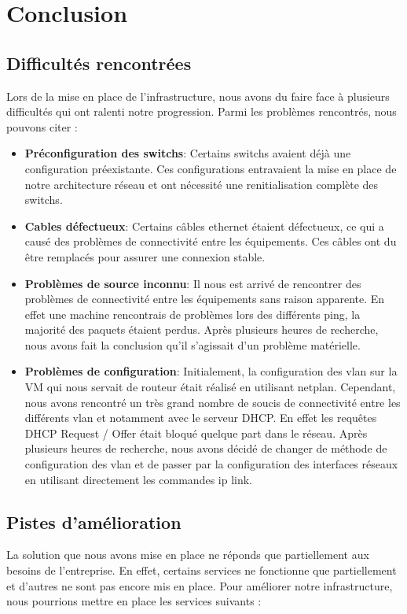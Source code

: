 \documentclass[a4paper,12pt]{report}
\begin{document}
    \chapter{Conclusion}
        \section{Difficultés rencontrées}

            Lors de la mise en place de l'infrastructure, nous avons du faire face à plusieurs difficultés qui ont ralenti notre progression. Parmi les problèmes rencontrés, nous pouvons citer :

            \begin{itemize}
                \item \textbf{Préconfiguration des switchs}: Certains switchs avaient déjà une configuration préexistante. Ces configurations entravaient la mise en place de notre architecture réseau et ont nécessité une renitialisation complète des switchs.
                \item \textbf{Cables défectueux}: Certains câbles ethernet étaient défectueux, ce qui a causé des problèmes de connectivité entre les équipements. Ces câbles ont du être remplacés pour assurer une connexion stable.
                \item \textbf{Problèmes de source inconnu}: Il nous est arrivé de rencontrer des problèmes de connectivité entre les équipements sans raison apparente. En effet une machine rencontrais de problèmes lors des différents ping, la majorité des paquets étaient perdus. Après plusieurs heures de recherche, nous avons fait la conclusion qu'il s'agissait d'un problème matérielle.
                \item \textbf{Problèmes de configuration}: Initialement, la configuration des vlan sur la VM qui nous servait de routeur était réalisé en utilisant netplan. Cependant, nous avons rencontré un très grand nombre de soucis de connectivité entre les différents vlan et notamment avec le serveur DHCP. En effet les requêtes DHCP Request / Offer était bloqué quelque part dans le réseau. Après plusieurs heures de recherche, nous avons décidé de changer de méthode de configuration des vlan et de passer par la configuration des interfaces réseaux en utilisant directement les commandes ip link. 
            \end{itemize}

        \section{Pistes d'amélioration}
            La solution que nous avons mise en place ne réponds que partiellement aux besoins de l'entreprise. En effet, certains services ne fonctionne que partiellement et d'autres ne sont pas encore mis en place. Pour améliorer notre infrastructure, nous pourrions mettre en place les services suivants :
\end{document}
